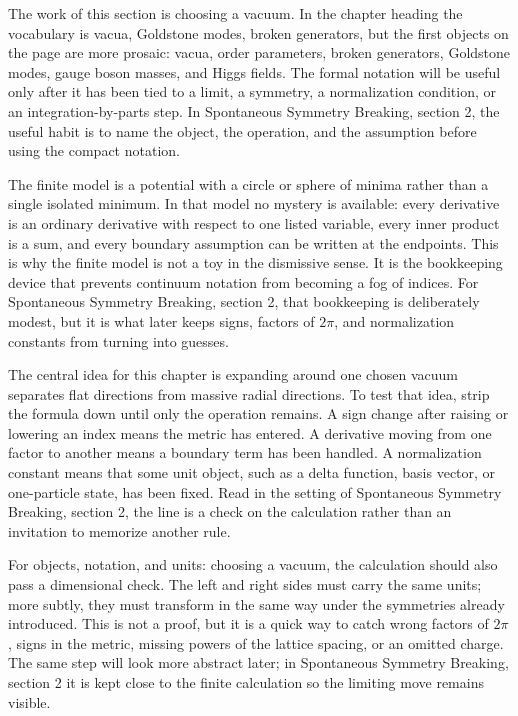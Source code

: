 The work of this section is choosing a vacuum.  In the chapter heading the vocabulary is vacua, Goldstone modes, broken generators, but the first objects on the page are more prosaic: vacua, order parameters, broken generators, Goldstone modes, gauge boson masses, and Higgs fields.  The formal notation will be useful only after it has been tied to a limit, a symmetry, a normalization condition, or an integration-by-parts step.  In Spontaneous Symmetry Breaking, section 2, the useful habit is to name the object, the operation, and the assumption before using the compact notation.

The finite model is a potential with a circle or sphere of minima rather than a single isolated minimum.  In that model no mystery is available: every derivative is an ordinary derivative with respect to one listed variable, every inner product is a sum, and every boundary assumption can be written at the endpoints.  This is why the finite model is not a toy in the dismissive sense.  It is the bookkeeping device that prevents continuum notation from becoming a fog of indices.  For Spontaneous Symmetry Breaking, section 2, that bookkeeping is deliberately modest, but it is what later keeps signs, factors of \(2\pi\), and normalization constants from turning into guesses.

The central idea for this chapter is expanding around one chosen vacuum separates flat directions from massive radial directions.  To test that idea, strip the formula down until only the operation remains.  A sign change after raising or lowering an index means the metric has entered.  A derivative moving from one factor to another means a boundary term has been handled.  A normalization constant means that some unit object, such as a delta function, basis vector, or one-particle state, has been fixed.  Read in the setting of Spontaneous Symmetry Breaking, section 2, the line is a check on the calculation rather than an invitation to memorize another rule.

For objects, notation, and units: choosing a vacuum, the calculation should also pass a dimensional check.  The left and right sides must carry the same units; more subtly, they must transform in the same way under the symmetries already introduced.  This is not a proof, but it is a quick way to catch wrong factors of \(2\pi\), signs in the metric, missing powers of the lattice spacing, or an omitted charge.  The same step will look more abstract later; in Spontaneous Symmetry Breaking, section 2 it is kept close to the finite calculation so the limiting move remains visible.

